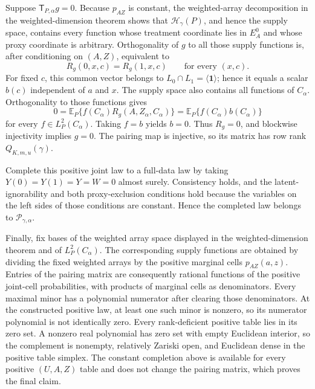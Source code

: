 Suppose \(\mathsf T_{P,\alpha}g=0\). Because \(p_{AZ}\) is constant, the weighted-array decomposition in the weighted-dimension theorem shows that \(\mathcal H_\gamma(P)\), and hence the supply space, contains every function whose treatment coordinate lies in \(E_A^0\) and whose proxy coordinate is arbitrary. Orthogonality of \(g\) to all those supply functions is, after conditioning on \((A,Z)\), equivalent to
\[R_g(0,x,c)=R_g(1,x,c)\qquad\text{for every }(x,c).\]
For fixed \(c\), this common vector belongs to \(L_0\cap L_1=\langle\mathbf 1\rangle\); hence it equals a scalar \(b(c)\) independent of \(a\) and \(x\). The supply space also contains all functions of \(C_\alpha\). Orthogonality to those functions gives
\[0=\mathbb E_P\{f(C_\alpha)R_g(A,Z_\alpha,C_\alpha)\}=\mathbb E_P\{f(C_\alpha)b(C_\alpha)\}\]
for every \(f\in L_P^2(C_\alpha)\). Taking \(f=b\) yields \(b=0\). Thus \(R_g=0\), and blockwise injectivity implies \(g=0\). The pairing map is injective, so its matrix has row rank \(Q_{K,m,u}(\gamma)\).

Complete this positive joint law to a full-data law by taking \(Y(0)=Y(1)=Y=W=0\) almost surely. Consistency holds, and the latent-ignorability and both proxy-exclusion conditions hold because the variables on the left sides of those conditions are constant. Hence the completed law belongs to \(\mathcal P_{\gamma,\alpha}\).

Finally, fix bases of the weighted array space displayed in the weighted-dimension theorem and of \(L_P^2(C_\alpha)\). The corresponding supply functions are obtained by dividing the fixed weighted arrays by the positive marginal cells \(p_{AZ}(a,z)\). Entries of the pairing matrix are consequently rational functions of the positive joint-cell probabilities, with products of marginal cells as denominators. Every maximal minor has a polynomial numerator after clearing those denominators. At the constructed positive law, at least one such minor is nonzero, so its numerator polynomial is not identically zero. Every rank-deficient positive table lies in its zero set. A nonzero real polynomial has zero set with empty Euclidean interior, so the complement is nonempty, relatively Zariski open, and Euclidean dense in the positive table simplex. The constant completion above is available for every positive \((U,A,Z)\) table and does not change the pairing matrix, which proves the final claim.